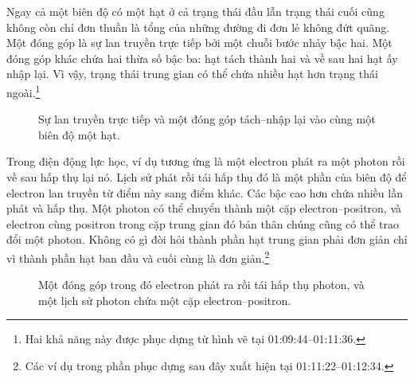 Ngay cả một biên độ có một hạt ở cả trạng thái đầu lẫn trạng thái cuối cũng không còn chỉ đơn thuần là tổng của những đường đi đơn lẻ không đứt quãng. Một đóng góp là sự lan truyền trực tiếp bởi một chuỗi bước nhảy bậc hai. Một đóng góp khác chứa hai thừa số bậc ba: hạt tách thành hai và về sau hai hạt ấy nhập lại. Vì vậy, trạng thái trung gian có thể chứa nhiều hạt hơn trạng thái ngoài.\footnote{Hai khả năng này được phục dựng từ hình vẽ tại 01:09:44--01:11:36.}

\begin{figure}[htbp]
\centering
{}
\caption{Sự lan truyền trực tiếp và một đóng góp tách--nhập lại vào cùng một biên độ một hạt.}
\end{figure}

Trong điện động lực học, ví dụ tương ứng là một electron phát ra một photon rồi về sau hấp thụ lại nó. Lịch sử phát rồi tái hấp thụ đó là một phần của biên độ để electron lan truyền từ điểm này sang điểm khác. Các bậc cao hơn chứa nhiều lần phát và hấp thụ. Một photon có thể chuyển thành một cặp electron--positron, và electron cùng positron trong cặp trung gian đó bản thân chúng cũng có thể trao đổi một photon. Không có gì đòi hỏi thành phần hạt trung gian phải đơn giản chỉ vì thành phần hạt ban đầu và cuối cùng là đơn giản.\footnote{Các ví dụ trong phần phục dựng sau đây xuất hiện tại 01:11:22--01:12:34.}

\begin{figure}[htbp]
\centering
{}
\caption{Một đóng góp trong đó electron phát ra rồi tái hấp thụ photon, và một lịch sử photon chứa một cặp electron--positron.}
\end{figure}

